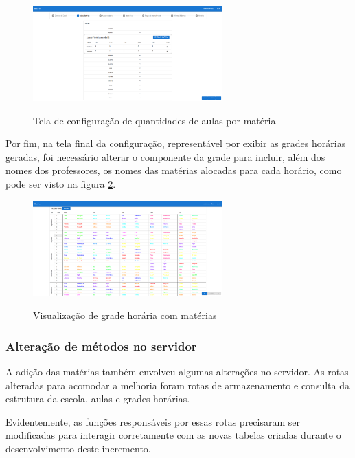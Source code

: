 \begin{figure}[!htb]
	\centering
	\caption{Tela de configuração de quantidades de aulas por matéria}
	\includegraphics[width=0.65\textwidth]{./dados/figuras/alteracaoAulas}
	\label{fig:alteracaoAulas}
\end{figure}

Por fim, na tela final da configuração, representável por exibir as grades horárias geradas, foi necessário alterar o componente da grade para incluir, além dos nomes dos professores, os nomes das matérias alocadas para cada horário, como pode ser visto na figura \ref{fig:alteracaoHorario}.

\begin{figure}[!htb]
	\centering
	\caption{Visualização de grade horária com matérias}
	\includegraphics[width=0.65\textwidth]{./dados/figuras/alteracaoHorarios}
	\label{fig:alteracaoHorario}
\end{figure}

\subsubsection{Alteração de métodos no servidor}
A adição das matérias também envolveu algumas alterações no servidor. As rotas alteradas para acomodar a melhoria foram rotas de armazenamento e consulta da estrutura da escola, aulas e grades horárias.

Evidentemente, as funções responsáveis por essas rotas precisaram ser modificadas para interagir corretamente com as novas tabelas criadas durante o desenvolvimento deste incremento.

